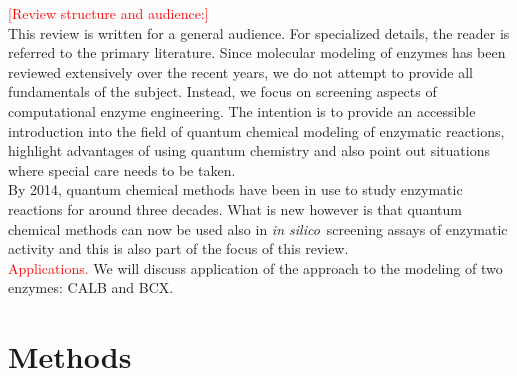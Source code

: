 \noindent\textcolor{red}{[Review structure and audience:]}\\
This review is written for a general audience.
For specialized details, the reader is referred to the primary literature.
Since molecular modeling of enzymes has been reviewed extensively over the recent years, we do not attempt to provide all fundamentals of the subject.
Instead, we focus on screening aspects of computational enzyme engineering.
The intention is to provide an accessible introduction into the field of quantum chemical modeling of enzymatic reactions, highlight advantages of using quantum chemistry and also point out situations where special care needs to be taken.\\
By 2014, quantum chemical methods have been in use to study enzymatic reactions for around three decades.
What is new however is that quantum chemical methods can now be used also in \textit{in silico} screening assays of enzymatic activity and this is also part of the focus of this review.\\
\textcolor{red}{Applications.}
We will discuss application of the approach to the modeling of two enzymes: CALB and BCX.




\clearpage
\section{Methods}\label{sec:methods}

